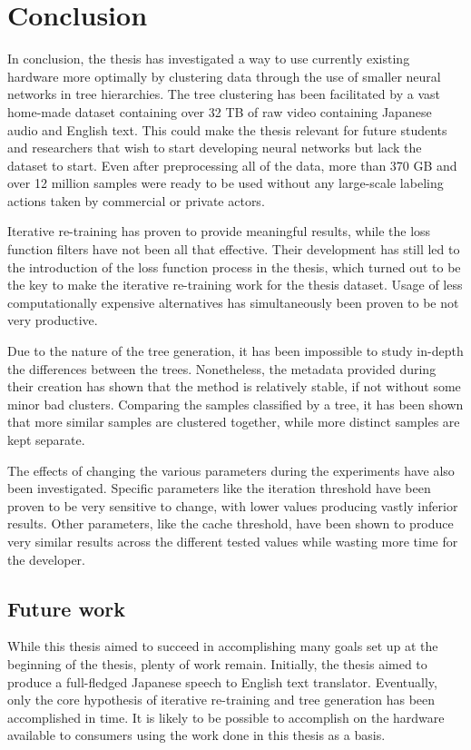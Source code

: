 \chapter{Conclusion}

In conclusion, the thesis has investigated a way to use currently existing hardware more optimally by clustering data through the use of smaller neural networks in tree hierarchies.
The tree clustering has been facilitated by a vast home-made dataset containing over 32 TB of raw video containing Japanese audio and English text.
This could make the thesis relevant for future students and researchers that wish to start developing neural networks but lack the dataset to start.
Even after preprocessing all of the data, more than 370 GB and over 12 million samples were ready to be used without any large-scale labeling actions taken by commercial or private actors.

Iterative re-training has proven to provide meaningful results, while the loss function filters have not been all that effective.
Their development has still led to the introduction of the loss function process in the thesis, which turned out to be the key to make the iterative re-training work for the thesis dataset.
Usage of less computationally expensive alternatives has simultaneously been proven to be not very productive.

Due to the nature of the tree generation, it has been impossible to study in-depth the differences between the trees.
Nonetheless, the metadata provided during their creation has shown that the method is relatively stable, if not without some minor bad clusters.
Comparing the samples classified by a tree, it has been shown that more similar samples are clustered together, while more distinct samples are kept separate.

The effects of changing the various parameters during the experiments have also been investigated.
Specific parameters like the iteration threshold have been proven to be very sensitive to change, with lower values producing vastly inferior results.
Other parameters, like the cache threshold, have been shown to produce very similar results across the different tested values while wasting more time for the developer.

\section{Future work}
While this thesis aimed to succeed in accomplishing many goals set up at the beginning of the thesis, plenty of work remain.
Initially, the thesis aimed to produce a full-fledged Japanese speech to English text translator.
Eventually, only the core hypothesis of iterative re-training and tree generation has been accomplished in time.
It is likely to be possible to accomplish on the hardware available to consumers using the work done in this thesis as a basis.

